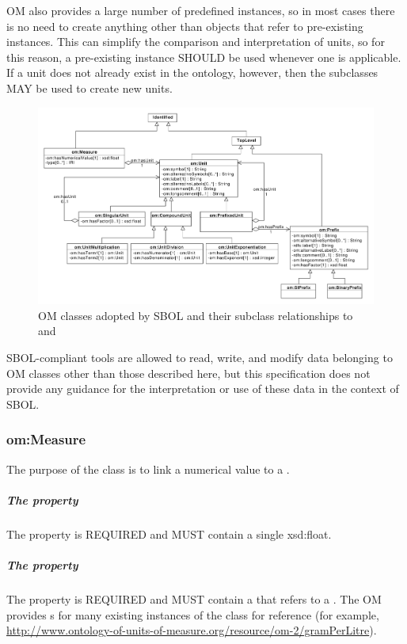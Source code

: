 OM also provides a large number of predefined  instances, so in most cases there is no need to create anything other than  objects that refer to pre-existing instances.
This can simplify the comparison and interpretation of units, so for this reason, a pre-existing  instance SHOULD be used whenever one is applicable.
If a unit does not already exist in the ontology, however, then the  subclasses MAY be used to create new units.


\begin{figure}[ht]
\begin{center}
\includegraphics[width=\linewidth]{uml/om}
\caption[]{OM classes adopted by SBOL and their subclass relationships to  and }
\label{uml:om}
\end{center}
\end{figure}

SBOL-compliant tools are allowed to read, write, and modify data belonging to OM classes other than those described here, but this specification does not provide any guidance for the interpretation or use of these data in the context of SBOL.

\subsubsection{om:Measure} \label{sec:om:Measure}

The purpose of the  class is to link a numerical value to a .

\subparagraph{The  property}\label{sec:om:hasNumericalValue}
The  property is REQUIRED and MUST contain a single xsd:float.

\subparagraph{The  property}\label{sec:om:hasUnit:Measure}
The  property is REQUIRED and MUST contain a  that refers to a . The OM provides s for many existing instances of the  class for reference (for example,\\ \url{http://www.ontology-of-units-of-measure.org/resource/om-2/gramPerLitre}).

